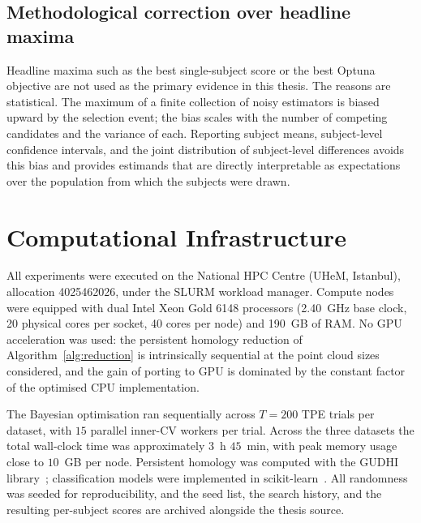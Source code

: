 \subsection{Methodological correction over headline maxima}
\label{subsubsec:headline-correction}

Headline maxima such as the best single-subject score or the best Optuna objective are not used as the primary evidence in this thesis. The reasons are statistical. The maximum of a finite collection of noisy estimators is biased upward by the selection event; the bias scales with the number of competing candidates and the variance of each. Reporting subject means, subject-level confidence intervals, and the joint distribution of subject-level differences avoids this bias and provides estimands that are directly interpretable as expectations over the population from which the subjects were drawn.

\section{Computational Infrastructure}
\label{subsec:compute}

All experiments were executed on the National HPC Centre (UHeM, Istanbul), allocation 4025462026, under the SLURM workload manager. Compute nodes were equipped with dual Intel Xeon Gold 6148 processors (2.40~GHz base clock, 20 physical cores per socket, 40 cores per node) and 190~GB of RAM. No GPU acceleration was used: the persistent homology reduction of Algorithm~\ref{alg:reduction} is intrinsically sequential at the point cloud sizes considered, and the gain of porting to GPU is dominated by the constant factor of the optimised CPU implementation.

The Bayesian optimisation ran sequentially across $T=200$ TPE trials per dataset, with $15$ parallel inner-CV workers per trial. Across the three datasets the total wall-clock time was approximately $3$~h $45$~min, with peak memory usage close to $10$~GB per node. Persistent homology was computed with the GUDHI library~\parencite{gudhi}; classification models were implemented in scikit-learn~\parencite{scikit-learn}. All randomness was seeded for reproducibility, and the seed list, the search history, and the resulting per-subject scores are archived alongside the thesis source.


